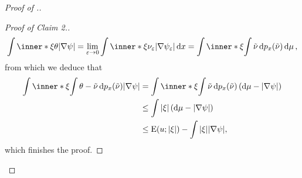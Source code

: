 \begin{proof}[Proof of .]
\begin{proof}[Proof of Claim 2.]
\begin{equation*}
			\int
				\inner*{ \xi }{ \theta }
			\abs{ \nabla \psi }
			=
			\lim_{ \varepsilon \to 0 }
				\int
					\inner*{ \xi }{ \nu_{ \varepsilon } }
					\abs{ \nabla \psi_{ \varepsilon } }
				\dd{ x }
			=
			\int
				\inner*{ \xi }{
					\int 
						\tilde{ \nu } 
					\dd{ p_{ x } ( \tilde{ \nu } ) } 
				}
			\dd{ \mu },
		\end{equation*}
		from which we deduce that
		\begin{align*}
			\int
				\inner*{ \xi }{
					\int
						\theta - \tilde{ \nu }
					\dd{ p_{ x } ( \tilde{ \nu } ) }
				}
			\abs{ \nabla \psi }
			& =
			\int
				\inner*{ \xi }{
					\int
						\tilde{ \nu }
					\dd{ p_{ x } ( \tilde{ \nu } ) }
				}
			\left(
				\dd{ \mu } - \abs{ \nabla \psi }
			\right)
			\\
			& \leq
			\int
				\abs{ \xi }
			\left(
				\dd{ \mu } - \abs{ \nabla \psi }
			\right)
			\\
			& \leq
			\energy ( u ; \abs{ \xi } )
			-
			\int
				\abs{ \xi }
			\abs{ \nabla \psi },
		\end{align*}
		which finishes the proof.
	\end{proof}


\end{proof}
